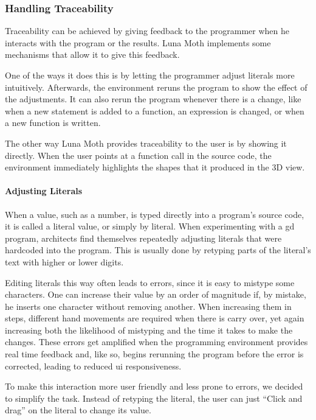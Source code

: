 \subsubsection{Handling Traceability}
Traceability can be achieved by giving feedback to the programmer when he interacts with the program or the results.
Luna Moth implements some mechanisms that allow it to give this feedback.

One of the ways it does this is by letting the programmer adjust literals more intuitively.
Afterwards, the environment reruns the program to show the effect of the adjustments.
It can also rerun the program whenever there is a change, like when a new statement is added to a function, an expression is changed, or when a new function is written.

The other way Luna Moth provides traceability to the user is by showing it directly.
When the user points at a function call in the source code, the environment immediately highlights the shapes that it produced in the 3D view.


\paragraph{Adjusting Literals}
When a value, such as a number, is typed directly into a program's source code, it is called a literal value, or simply by literal.
When experimenting with a \gls{gd} program, architects find themselves repeatedly adjusting literals that were hardcoded into the program.
This is usually done by retyping parts of the literal's text with higher or lower digits.

Editing literals this way often leads to errors, since it is easy to mistype some characters.
One can increase their value by an order of magnitude if, by mistake, he inserts one character without removing another.
When increasing them in steps, different hand movements are required when there is carry over, yet again increasing both the likelihood of mistyping and the time it takes to make the changes.
These errors get amplified when the programming environment provides real time feedback and, like so, begins rerunning the program before the error is corrected, leading to reduced \gls{ui} responsiveness.

To make this interaction more user friendly and less prone to errors, we decided to simplify the task.
Instead of retyping the literal, the user can just ``Click and drag'' on the literal to change its value.

